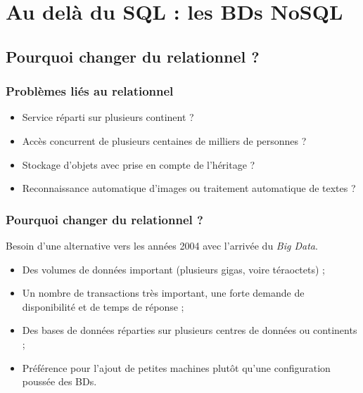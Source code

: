 \section{Au delà du SQL : les BDs NoSQL}

	\subsection{Pourquoi changer du relationnel ?}
	\begin{frame}
		\frametitle{Problèmes liés au relationnel}
		
		\begin{itemize}
			\item Service réparti sur plusieurs continent ?
			\item Accès concurrent de plusieurs centaines de milliers de personnes ?
			\item Stockage d'objets avec prise en compte de l'héritage ?
			\item Reconnaissance automatique d'images ou traitement automatique de textes ?
		\end{itemize}

	\end{frame}

	\begin{frame}
		\frametitle{Pourquoi changer du relationnel ?}

		Besoin d'une alternative vers les années 2004 avec l'arrivée du \textit{Big Data}.
		\begin{itemize}
			\item Des volumes de données important (plusieurs gigas, voire téraoctets) ;
			\item Un nombre de transactions très important, une forte demande de disponibilité et de temps de réponse ;
			\item Des bases de données réparties sur plusieurs centres de données ou continents ;
			\item Préférence pour l'ajout de petites machines plutôt qu'une configuration poussée des BDs.
		\end{itemize}

	\end{frame}

